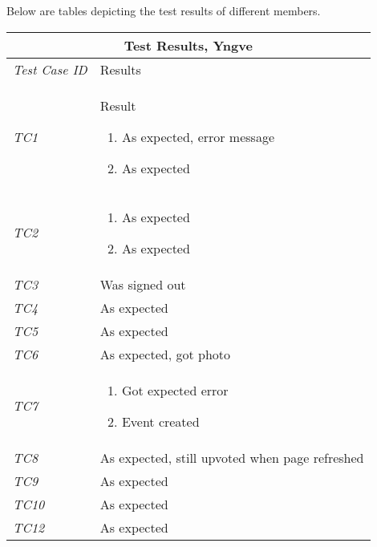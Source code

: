 Below are tables depicting the test results of different members. 
%
\begin{minipage}{\linewidth}
\setlength{\tabcolsep}{15pt}
\centering
{}
\begin{tabular}{ |l|p{70mm}| }
	\hline
	\multicolumn{2}{|c|}{\cellcolor{gray!25} \textbf{Test Results, Yngve}} \\
	\hline
	\it{\cellcolor{gray!25}Test Case ID} & {\cellcolor{gray!25} Results } \\
	\hline
	\it{\cellcolor{gray!25}TC1} & Result \begin{enumerate}[label=\alph*)]
	                                       \item As expected, error message
	                                       \item As expected
	                                     \end{enumerate}\\ \hline
	\it{\cellcolor{gray!25}TC2} & \begin{enumerate}[label=\alph*)]
	                                \item As expected
	                                \item As expected
	                              \end{enumerate}\\ \hline
	\it{\cellcolor{gray!25}TC3} & Was signed out \\ \hline
	\it{\cellcolor{gray!25}TC4} & As expected \\ \hline
	\it{\cellcolor{gray!25}TC5} & As expected \\ \hline
	\it{\cellcolor{gray!25}TC6} & As expected, got photo \\ \hline
	\it{\cellcolor{gray!25}TC7} & \begin{enumerate}[label=\alph*)]
	                                \item Got expected error
	                                \item Event created
                                  \end{enumerate}\\ \hline
	\it{\cellcolor{gray!25}TC8} & As expected, still upvoted when page refreshed \\ \hline
	\it{\cellcolor{gray!25}TC9} & As expected \\ \hline
	\it{\cellcolor{gray!25}TC10} & As expected \\ \hline
	\it{\cellcolor{gray!25}TC12} & As expected \\ \hline

\end{tabular}
\end{minipage}
